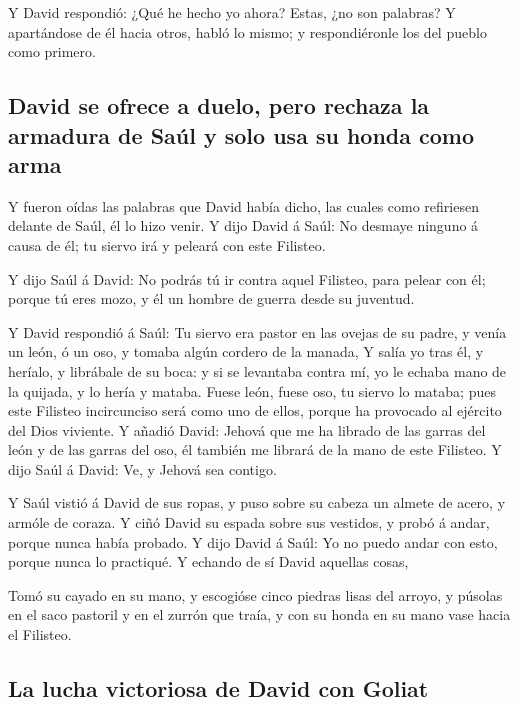  Y David respondió: ¿Qué he hecho yo ahora? Estas, ¿no
son palabras?  Y apartándose de él hacia otros, habló lo
mismo; y respondiéronle los del pueblo como primero.

\hypertarget{david-se-ofrece-a-duelo-pero-rechaza-la-armadura-de-sauxfal-y-solo-usa-su-honda-como-arma}{%
\subsection{David se ofrece a duelo, pero rechaza la armadura de Saúl y
solo usa su honda como
arma}\label{david-se-ofrece-a-duelo-pero-rechaza-la-armadura-de-sauxfal-y-solo-usa-su-honda-como-arma}}

 Y fueron oídas las palabras que David había dicho, las
cuales como refiriesen delante de Saúl, él lo hizo venir.
 Y dijo David á Saúl: No desmaye ninguno á causa de él;
tu siervo irá y peleará con este Filisteo.

 Y dijo Saúl á David: No podrás tú ir contra aquel
Filisteo, para pelear con él; porque tú eres mozo, y él un hombre de
guerra desde su juventud.

 Y David respondió á Saúl: Tu siervo era pastor en las
ovejas de su padre, y venía un león, ó un oso, y tomaba algún cordero de
la manada,  Y salía yo tras él, y heríalo, y librábale de
su boca: y si se levantaba contra mí, yo le echaba mano de la quijada, y
lo hería y mataba.  Fuese león, fuese oso, tu siervo lo
mataba; pues este Filisteo incircunciso será como uno de ellos, porque
ha provocado al ejército del Dios viviente.  Y añadió
David: Jehová que me ha librado de las garras del león y de las garras
del oso, él también me librará de la mano de este Filisteo. Y dijo Saúl
á David: Ve, y Jehová sea contigo.

 Y Saúl vistió á David de sus ropas, y puso sobre su
cabeza un almete de acero, y armóle de coraza.  Y ciñó
David su espada sobre sus vestidos, y probó á andar, porque nunca había
probado. Y dijo David á Saúl: Yo no puedo andar con esto, porque nunca
lo practiqué. Y echando de sí David aquellas cosas,

 Tomó su cayado en su mano, y escogióse cinco piedras
lisas del arroyo, y púsolas en el saco pastoril y en el zurrón que
traía, y con su honda en su mano vase hacia el Filisteo.

\hypertarget{la-lucha-victoriosa-de-david-con-goliat}{%
\subsection{La lucha victoriosa de David con
Goliat}\label{la-lucha-victoriosa-de-david-con-goliat}}

